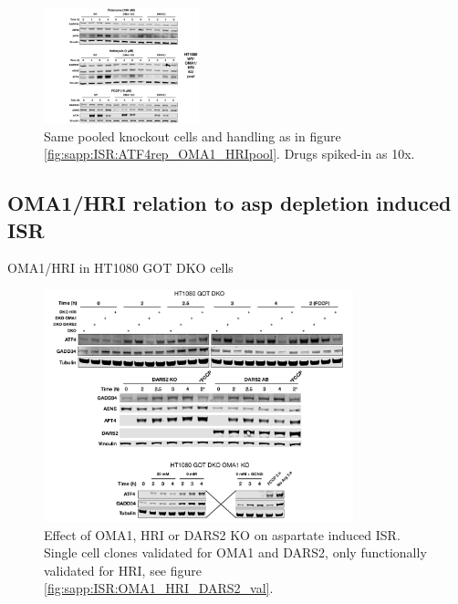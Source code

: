 \begin{figure}
    \centering
    \includegraphics[width=0.40\textwidth]{figures/sapp/ISR/ATF4wes_OMA1_HRIpool.pdf}
    \caption[ATF4 post mito inhib. OMA1/HRI KO, western]{
    Same pooled knockout cells and handling as in figure \ref{fig:sapp:ISR:ATF4rep_OMA1_HRIpool}.
    Drugs spiked-in as 10x.
    }
    \label{fig:sapp:ISR:ATF4wes_OMA1_HRIpool}
\end{figure}






\subsection{OMA1/HRI relation to asp depletion induced ISR}
OMA1/HRI in HT1080 GOT DKO cells


\begin{figure}
    \centering
    \includegraphics[width=0.80\textwidth]{figures/sapp/ISR/HT1080_DKO_KO_ISR.pdf}
    \caption[ATF4 post Asp depl. OMA1/HRI KO, western]{
    Effect of OMA1, HRI or DARS2 KO on aspartate induced ISR.
    Single cell clones validated for OMA1 and DARS2, only functionally validated for HRI, see figure \ref{fig:sapp:ISR:OMA1_HRI_DARS2_val}.
    }
    \label{fig:sapp:ISR:HT1080_DKO_KO_ISR}
\end{figure}

